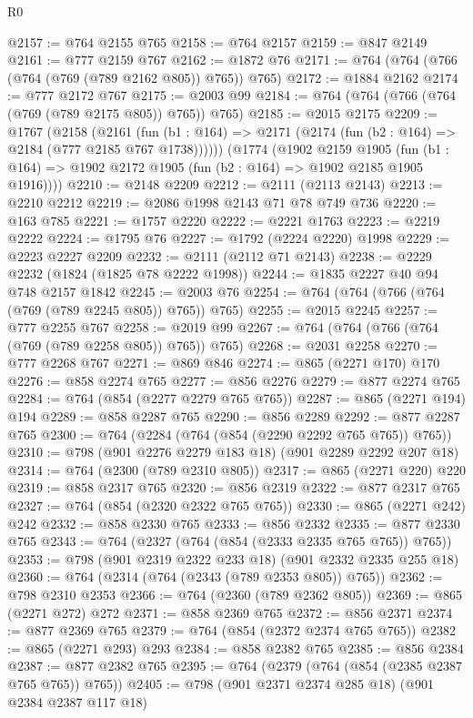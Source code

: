 \begin{lexlean}{R0}
\begin{coremodule}
@2157 := @764 @2155 @765
@2158 := @764 @2157
@2159 := @847 @2149
@2161 := @777 @2159 @767
@2162 := @1872 @76
@2171 := @764 (@764 (@766 (@764 (@769 (@789 @2162 @805)) @765)) @765)
@2172 := @1884 @2162
@2174 := @777 @2172 @767
@2175 := @2003 @99
@2184 := @764 (@764 (@766 (@764 (@769 (@789 @2175 @805)) @765)) @765)
@2185 := @2015 @2175
@2209 := @1767
    (@2158
      (@2161 (fun (b1 : @164) => @2171 (@2174 (fun (b2 : @164) => @2184 (@777 @2185 @767 @1738))))))
    (@1774
      (@1902
        @2159
        @1905
        (fun (b1 : @164) => @1902 @2172 @1905 (fun (b2 : @164) => @1902 @2185 @1905 @1916))))
@2210 := @2148 @2209
@2212 := @2111 (@2113 @2143)
@2213 := @2210 @2212
@2219 := @2086 @1998 @2143 @71 @78 @749 @736
@2220 := @163 @785
@2221 := @1757 @2220
@2222 := @2221 @1763
@2223 := @2219 @2222
@2224 := @1795 @76
@2227 := @1792 (@2224 @2220) @1998
@2229 := @2223 @2227 @2209
@2232 := @2111 (@2112 @71 @2143)
@2238 := @2229 @2232 (@1824 (@1825 @78 @2222 @1998))
@2244 := @1835 @2227 @40 @94 @748 @2157 @1842
@2245 := @2003 @76
@2254 := @764 (@764 (@766 (@764 (@769 (@789 @2245 @805)) @765)) @765)
@2255 := @2015 @2245
@2257 := @777 @2255 @767
@2258 := @2019 @99
@2267 := @764 (@764 (@766 (@764 (@769 (@789 @2258 @805)) @765)) @765)
@2268 := @2031 @2258
@2270 := @777 @2268 @767
@2271 := @869 @846
@2274 := @865 (@2271 @170) @170
@2276 := @858 @2274 @765
@2277 := @856 @2276
@2279 := @877 @2274 @765
@2284 := @764 (@854 (@2277 @2279 @765 @765))
@2287 := @865 (@2271 @194) @194
@2289 := @858 @2287 @765
@2290 := @856 @2289
@2292 := @877 @2287 @765
@2300 := @764 (@2284 (@764 (@854 (@2290 @2292 @765 @765)) @765))
@2310 := @798 (@901 @2276 @2279 @183 @18) (@901 @2289 @2292 @207 @18)
@2314 := @764 (@2300 (@789 @2310 @805))
@2317 := @865 (@2271 @220) @220
@2319 := @858 @2317 @765
@2320 := @856 @2319
@2322 := @877 @2317 @765
@2327 := @764 (@854 (@2320 @2322 @765 @765))
@2330 := @865 (@2271 @242) @242
@2332 := @858 @2330 @765
@2333 := @856 @2332
@2335 := @877 @2330 @765
@2343 := @764 (@2327 (@764 (@854 (@2333 @2335 @765 @765)) @765))
@2353 := @798 (@901 @2319 @2322 @233 @18) (@901 @2332 @2335 @255 @18)
@2360 := @764 (@2314 (@764 (@2343 (@789 @2353 @805)) @765))
@2362 := @798 @2310 @2353
@2366 := @764 (@2360 (@789 @2362 @805))
@2369 := @865 (@2271 @272) @272
@2371 := @858 @2369 @765
@2372 := @856 @2371
@2374 := @877 @2369 @765
@2379 := @764 (@854 (@2372 @2374 @765 @765))
@2382 := @865 (@2271 @293) @293
@2384 := @858 @2382 @765
@2385 := @856 @2384
@2387 := @877 @2382 @765
@2395 := @764 (@2379 (@764 (@854 (@2385 @2387 @765 @765)) @765))
@2405 := @798 (@901 @2371 @2374 @285 @18) (@901 @2384 @2387 @117 @18)

\end{coremodule}
\end{lexlean}
